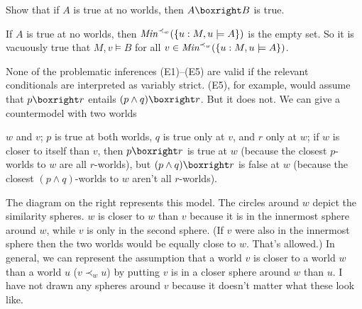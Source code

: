 \begin{exercise}
  Show that if $A$ is true at no worlds, then $A \boxright B$ is true.
\end{exercise}
\begin{solution}
  If $A$ is true at no worlds, then $\emph{Min}^{\prec_w}(\{u: M,u\models A\})$
  is the empty set. So it is vacuously true that $M,v \models B$ for all
  $v \in \emph{Min}^{\prec_w}(\{ u: M,u \models A \})$.
\end{solution}

None of the problematic inferences (E1)--(E5) are valid if the relevant
conditionals are interpreted as variably strict. (E5), for example, would assume
that $p \boxright r $ entails $(p \land q) \boxright r$. But it does not.
We can
give a countermodel with two worlds
\begin{wrapfigure}{r}{5cm}
  \vspace{-5mm}
  \quad
  \vspace{-20mm}
\end{wrapfigure}
$w$ and $v$; $p$ is true at both worlds, $q$
is true only at $v$, and $r$ only at $w$; if $w$ is closer
to itself than $v$,
then $p \boxright r$ is true at $w$ (because the closest $p$-worlds to $w$ are
all $r$-worlds), but $(p \land q) \boxright r$ is false at $w$ (because the
closest $(p\land q)$-worlds to $w$ aren't all $r$-worlds).

The diagram on the right represents this model. The circles around $w$ depict
the similarity spheres. $w$ is closer to $w$ than $v$ because it is in the
innermost sphere around $w$, while $v$ is only in the second sphere. (If $v$
were also in the innermost sphere then the two worlds would be equally close to
$w$. That's allowed.) In general, we can represent the assumption that a world $v$
is closer to a world $w$ than a world $u$ ($v \prec_w u$) by putting $v$ is in a
closer sphere around $w$ than $u$. I have not drawn any spheres around $v$
because it doesn't matter what these look like.


